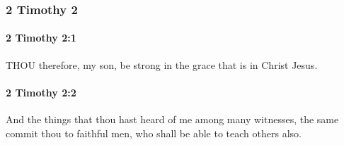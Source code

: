 	\subsubsection{2 Timothy 2} %
		\label{2TIMOTHY-2}
		
		\paragraph{2 Timothy 2:1} %
			\label{2TIMOTHY-2-1}

			THOU therefore, my son, be strong in the grace that is in Christ Jesus.

			\begin{framed}
			\scriptsize
				\begin{compactdesc}
					\item[SBLG] 
				\end{compactdesc}
			\end{framed}

		\paragraph{2 Timothy 2:2} %
			\label{2TIMOTHY-2-2}

			And the things that thou hast heard of me among many witnesses, the same commit thou to faithful men, who shall be able to teach others also.

